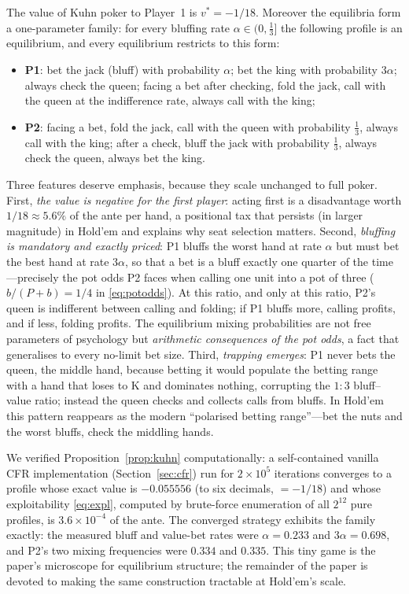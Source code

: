 \begin{proposition}\label{prop:kuhn}
The value of Kuhn poker to Player~1 is $v^{*} = -1/18$. Moreover the equilibria form a one-parameter family: for every bluffing rate $\alpha \in (0, \tfrac13]$ the following profile is an equilibrium, and every equilibrium restricts to this form:
\begin{itemize}[leftmargin=1.5em,itemsep=1pt]
\item \textbf{P1}: bet the jack (bluff) with probability $\alpha$; bet the king with probability $3\alpha$; always check the queen; facing a bet after checking, fold the jack, call with the queen at the indifference rate, always call with the king;
\item \textbf{P2}: facing a bet, fold the jack, call with the queen with probability $\tfrac13$, always call with the king; after a check, bluff the jack with probability $\tfrac13$, always check the queen, always bet the king.
\end{itemize}
\end{proposition}

Three features deserve emphasis, because they scale unchanged to full poker. First, \emph{the value is negative for the first player}: acting first is a disadvantage worth $1/18 \approx 5.6\%$ of the ante per hand, a positional tax that persists (in larger magnitude) in Hold'em and explains why seat selection matters. Second, \emph{bluffing is mandatory and exactly priced}: P1 bluffs the worst hand at rate $\alpha$ but must bet the best hand at rate $3\alpha$, so that a bet is a bluff exactly one quarter of the time---precisely the pot odds P2 faces when calling one unit into a pot of three ($b/(P+b) = 1/4$ in \eqref{eq:potodds}). At this ratio, and only at this ratio, P2's queen is indifferent between calling and folding; if P1 bluffs more, calling profits, and if less, folding profits. The equilibrium mixing probabilities are not free parameters of psychology but \emph{arithmetic consequences of the pot odds}, a fact that generalises to every no-limit bet size. Third, \emph{trapping emerges}: P1 never bets the queen, the middle hand, because betting it would populate the betting range with a hand that loses to K and dominates nothing, corrupting the $1{:}3$ bluff--value ratio; instead the queen checks and collects calls from bluffs. In Hold'em this pattern reappears as the modern ``polarised betting range''---bet the nuts and the worst bluffs, check the middling hands.

We verified Proposition~\ref{prop:kuhn} computationally: a self-contained vanilla CFR implementation (Section~\ref{sec:cfr}) run for $2 \times 10^{5}$ iterations converges to a profile whose exact value is $-0.055556$ (to six decimals, $= -1/18$) and whose exploitability \eqref{eq:expl}, computed by brute-force enumeration of all $2^{12}$ pure profiles, is $3.6 \times 10^{-4}$ of the ante. The converged strategy exhibits the family exactly: the measured bluff and value-bet rates were $\alpha = 0.233$ and $3\alpha = 0.698$, and P2's two mixing frequencies were $0.334$ and $0.335$. This tiny game is the paper's microscope for equilibrium structure; the remainder of the paper is devoted to making the same construction tractable at Hold'em's scale.
